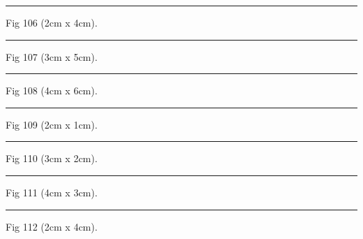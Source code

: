 \documentclass[a4paper,11pt]{article}
\begin{document}
\begin{swarmwrap}%
  \begin{minipage}[t]{2cm}
    \centering
    \rule{\linewidth}{4cm}
    {\footnotesize Fig 106 (2cm x 4cm).}
  \end{minipage}%
\end{swarmwrap}%
\swarmwrapnext
\lipsum[106]%

\begin{swarmwrap}%
  \begin{minipage}[t]{3cm}
    \centering
    \rule{\linewidth}{5cm}
    {\footnotesize Fig 107 (3cm x 5cm).}
  \end{minipage}%
\end{swarmwrap}%
\swarmwrapnext
\lipsum[107]%

\begin{swarmwrap}%
  \begin{minipage}[t]{4cm}
    \centering
    \rule{\linewidth}{6cm}
    {\footnotesize Fig 108 (4cm x 6cm).}
  \end{minipage}%
\end{swarmwrap}%
\swarmwrapnext
\lipsum[108]%

\begin{swarmwrap}%
  \begin{minipage}[t]{2cm}
    \centering
    \rule{\linewidth}{1cm}
    {\footnotesize Fig 109 (2cm x 1cm).}
  \end{minipage}%
\end{swarmwrap}%
\swarmwrapnext
\lipsum[109]%

\begin{swarmwrap}%
  \begin{minipage}[t]{3cm}
    \centering
    \rule{\linewidth}{2cm}
    {\footnotesize Fig 110 (3cm x 2cm).}
  \end{minipage}%
\end{swarmwrap}%
\swarmwrapnext
\lipsum[110]%

\begin{swarmwrap}%
  \begin{minipage}[t]{4cm}
    \centering
    \rule{\linewidth}{3cm}
    {\footnotesize Fig 111 (4cm x 3cm).}
  \end{minipage}%
\end{swarmwrap}%
\swarmwrapnext
\lipsum[111]%

\begin{swarmwrap}%
  \begin{minipage}[t]{2cm}
    \centering
    \rule{\linewidth}{4cm}
    {\footnotesize Fig 112 (2cm x 4cm).}
  \end{minipage}%
\end{swarmwrap}%
\swarmwrapnext
\lipsum[112]%
\end{document}
